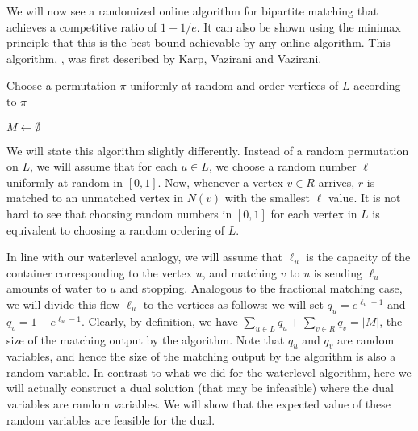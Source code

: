 %  


We will now see a randomized online algorithm for bipartite matching that
achieves a competitive ratio of $1 - 1/e$. It can also be shown using the
minimax principle that this is the best bound achievable by any online
algorithm. This algorithm, \ranking, was first described by Karp, Vazirani and
Vazirani.

\begin{algorithm}[h]
  
  Choose a permutation $\pi$ uniformly at random and order vertices of $L$
  according to $\pi$
  
  $M \gets \emptyset$
  
  \label{alg:ranking}
  \caption{\ranking}
\end{algorithm}

We will state this algorithm slightly differently. Instead of a random
permutation on $L$, we will assume that for each $u\in L$, we choose a random
number $\ell$ uniformly at random in $[0,1]$. Now, whenever a vertex $v\in R$
arrives, $r$ is matched to an unmatched vertex in $N(v)$ with the smallest
$\ell$ value. It is not hard to see that choosing random numbers in $[0,1]$ for
each vertex in $L$ is equivalent to choosing a random ordering of $L$.

In line with our waterlevel analogy, we will assume that $\ell_u$ is the
capacity of the container corresponding to the vertex $u$, and matching $v$ to
$u$ is sending $\ell_u$ amounts of water to $u$ and stopping. Analogous to the
fractional matching case, we will divide this flow $\ell_u$ to the vertices as
follows: we will set $q_u = e^{\ell_u - 1}$ and $q_v = 1 -
e^{\ell_u-1}$. Clearly, by definition, we have
$\sum_{u\in L} q_u + \sum_{v\in R} q_v = |M|$, the size of the matching output
by the algorithm. Note that $q_u$ and $q_v$ are random variables, and hence the
size of the matching output by the algorithm is also a random variable. In
contrast to what we did for the waterlevel algorithm, here we will actually
construct a dual solution (that may be infeasible) where the dual variables are
random variables. We will show that the expected value of these random variables
are feasible for the dual.

